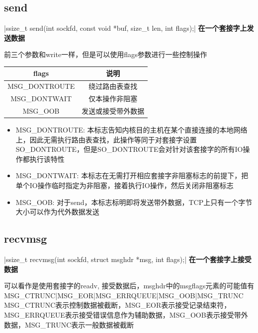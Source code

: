 \subsection{send}
|ssize_t send(int sockfd, const void *buf, size_t len, int flags);|
\noindent \textbf{在一个套接字上发送数据}
\begin{spacing}{2.0}
前三个参数和write一样，但是可以使用flags参数进行一些控制操作
\end{spacing}
\begin{table}[!htb]
\centering
	\begin{tabular}{|c|c|}
	\hline
	flags & 说明 \\
	\hline
		MSG\_DONTROUTE & 绕过路由表查找 \\
	\hline
		MSG\_DONTWAIT & 仅本操作非阻塞 \\
	\hline
		MSG\_OOB & 发送或接受带外数据 \\
	\hline
	\end{tabular}
\end{table}
\begin{itemize}
	\item MSG\_DONTROUTE: 本标志告知内核目的主机在某个直接连接的本地网络上，因此无需执行路由表查找，此操作等同于对套接字设置SO\_DONTROUTE，但是SO\_DONTROUTE会对针对该套接字的所有IO操作都执行该特性
	\item MSG\_DONTWAIT: 本标志在无需打开相应套接字非阻塞标志的前提下，把单个IO操作临时指定为非阻塞，接着执行IO操作，然后关闭非阻塞标志
	\item MSG\_OOB: 对于send，本标志标明即将发送带外数据，TCP上只有一个字节大小可以作为代外数据发送
\end{itemize}
\newpage

\subsection{recvmsg}
|ssize_t recvmsg(int sockfd, struct msghdr *msg, int flags);|
\noindent \textbf{在一个套接字上接受数据}
\begin{spacing}{2.0}
可以看作是使用套接字的readv, 接受数据后，msghdr中的msg\li flags元素的可能值有MSG\_CTRUNC|MSG\_EOR|MSG\_ERRQUEUE|MSG\_OOB|MSG\_TRUNC MSG\_CTRUNC表示控制数据被截断，MSG\_EOR表示接受记录结束符，MSG\_ERRQUEUE表示接受错误信息作为辅助数据，MSG\_OOB表示接受带外数据，MSG\_TRUNC表示一般数据被截断
\end{spacing}
\newpage

